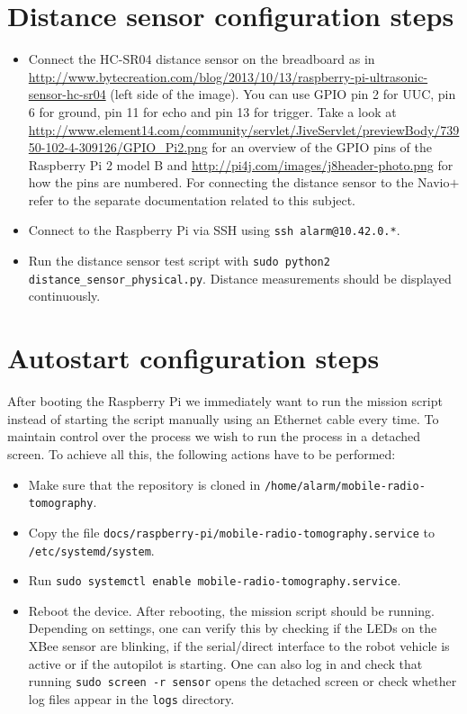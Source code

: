 \documentclass{article}
\newcommand{\navio}{Navio$\stackrel{}{+}$}
\begin{document}
\section{Distance sensor configuration steps}
\begin{itemize}
    \item Connect the HC-SR04 distance sensor on the breadboard as in
          \url{http://www.bytecreation.com/blog/2013/10/13/raspberry-pi-ultrasonic-sensor-hc-sr04}
          (left side of the image). You can use GPIO pin 2 for UUC, pin 6 for
          ground, pin 11 for echo and pin 13 for trigger. Take a look at
          \url{http://www.element14.com/community/servlet/JiveServlet/previewBody/73950-102-4-309126/GPIO_Pi2.png}
          for an overview of the GPIO pins of the Raspberry Pi 2 model B and
          \url{http://pi4j.com/images/j8header-photo.png} for how the pins are
          numbered. For connecting the distance sensor to the \navio{} refer to 
          the separate documentation related to this subject.
    \item Connect to the Raspberry Pi via SSH using {\tt ssh alarm@10.42.0.*}.
    \item Run the distance sensor test script with {\tt sudo python2 
          distance\_sensor\_physical.py}. Distance measurements should be 
          displayed continuously.
\end{itemize}

\section{Autostart configuration steps}
After booting the Raspberry Pi we immediately want to run the mission script 
instead of starting the script manually using an Ethernet cable every time. To 
maintain control over the process we wish to run the process in a detached 
screen. To achieve all this, the following actions have to be performed:

\begin{itemize}
    \item Make sure that the repository is cloned in
          {\tt /home/alarm/mobile-radio-tomography}.
    \item Copy the file {\tt docs/raspberry-pi/mobile-radio-tomography.service} 
          to {\tt /etc/systemd/system}.
    \item Run {\tt sudo systemctl enable mobile-radio-tomography.service}.
    \item Reboot the device. After rebooting, the mission script should be 
          running. Depending on settings, one can verify this by checking if 
          the LEDs on the XBee sensor are blinking, if the serial/direct 
          interface to the robot vehicle is active or if the autopilot is 
          starting. One can also log in and check that running {\tt sudo screen 
          -r sensor} opens the detached screen or check whether log files 
          appear in the {\tt logs} directory.
\end{itemize}
\end{document}

